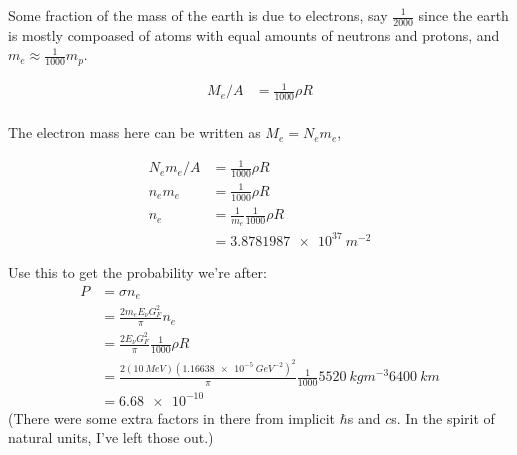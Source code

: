 \begin{enumerate}[label=\textbf{\alph*}.]
  Some fraction of the mass of the earth is due to electrons, say $\frac{1}{2000}$ since the earth is mostly compoased of atoms with equal amounts of neutrons and protons, and $m_e \approx \frac{1}{1000} m_p$.

  \begin{align*}
    M_e/A &= \frac{1}{1000}\rho R\\
  \end{align*}

  The electron mass here can be written as $M_e = N_e m_e$,

  \begin{align*}
    N_e m_e/A &= \frac{1}{1000}\rho R\\
    n_e m_e &= \frac{1}{1000}\rho R\\
    n_e &= \frac{1}{m_e}\frac{1}{1000}\rho R\\
    &= \SI{3.8781987e37}{m^{-2}}
  \end{align*}

  Use this to get the probability we're after:
  \begin{align*}
    P &= \sigma n_e \\
    &= \frac{2m_e E_\nu G_F^2}{\pi} n_e \\
    &= \frac{2E_\nu G_F^2}{\pi} \frac{1}{1000}\rho R\\
    &= \frac{2(\SI{10}{MeV}) (\SI{1.16638e-5}{GeV^{-2}})^2}{\pi} \frac{1}{1000}\SI{5520}{kgm^{-3}}\SI{6400}{km} \\
    &= \SI{6.68e-10}{}
  \end{align*}
  (There were some extra factors in there from implicit $\hbar$s and $c$s. In the spirit of natural units, I've left those out.)

\end{enumerate}

